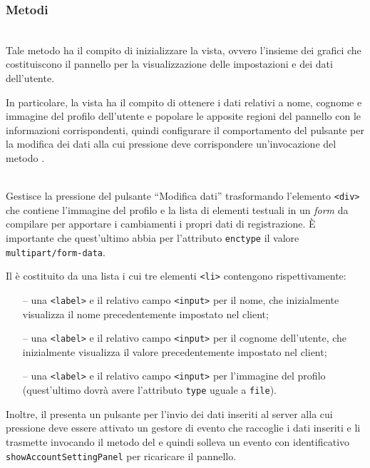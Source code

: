 \subsubsection*{Metodi}
\begin{description}
\item{}\\
Tale metodo ha il compito di inizializzare la vista, ovvero l'insieme dei  grafici che costituiscono il pannello per la visualizzazione delle impostazioni e dei dati dell'utente.

In particolare, la vista ha il compito di ottenere i dati relativi a nome, cognome e immagine del profilo dell'utente e popolare le apposite regioni del pannello con le informazioni corrispondenti, quindi configurare il comportamento del pulsante per la modifica dei dati alla cui pressione deve corrispondere un'invocazione del metodo .

\item{}\\
Gestisce la pressione del pulsante ``Modifica dati'' trasformando l'elemento \verb'<div>' che contiene l'immagine del profilo e la lista di elementi testuali in un \textit{form} da compilare per apportare i cambiamenti i propri dati di registrazione. È importante che quest'ultimo abbia per l'attributo \verb'enctype' il valore \verb'multipart/form-data'.

Il  è costituito da una lista i cui tre elementi \verb'<li>' contengono rispettivamente:
\begin{itemize}
  \item[--] una \verb'<label>' e il relativo campo \verb'<input>' per il nome, che inizialmente visualizza il nome precedentemente impostato nel client;
  \item[--] una \verb'<label>' e il relativo campo \verb'<input>' per il cognome dell'utente, che inizialmente visualizza il valore precedentemente impostato nel client;
  \item[--] una \verb'<label>' e il relativo campo \verb'<input>' per l'immagine del profilo (quest'ultimo dovrà avere l'attributo \verb'type' uguale a \verb'file').
\end{itemize}

Inoltre, il  presenta un pulsante per l'invio dei dati inseriti al server alla cui pressione deve essere attivato un gestore di evento che raccoglie i dati inseriti e li trasmette invocando il metodo  del  e quindi solleva un evento con identificativo \verb'showAccountSettingPanel' per ricaricare il pannello.

\end{description}

